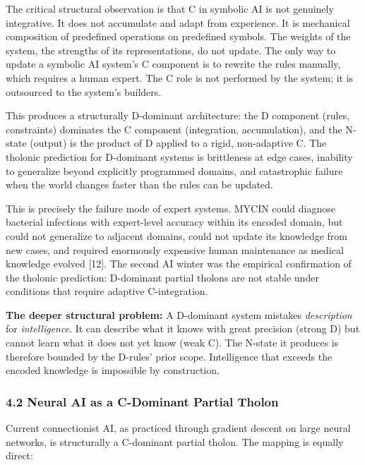 \documentclass[
  11pt,
  letterpaper,
]{article}
\begin{document}
The critical structural observation is that C in symbolic AI is not
genuinely integrative. It does not accumulate and adapt from experience.
It is mechanical composition of predefined operations on predefined
symbols. The weights of the system, the strengths of its
representations, do not update. The only way to update a symbolic AI
system's C component is to rewrite the rules manually, which requires a
human expert. The C role is not performed by the system; it is
outsourced to the system's builders.

This produces a structurally D-dominant architecture: the D component
(rules, constraints) dominates the C component (integration,
accumulation), and the N-state (output) is the product of D applied to a
rigid, non-adaptive C. The tholonic prediction for D-dominant systems is
brittleness at edge cases, inability to generalize beyond explicitly
programmed domains, and catastrophic failure when the world changes
faster than the rules can be updated.

This is precisely the failure mode of expert systems. MYCIN could
diagnose bacterial infections with expert-level accuracy within its
encoded domain, but could not generalize to adjacent domains, could not
update its knowledge from new cases, and required enormously expensive
human maintenance as medical knowledge evolved {[}12{]}. The second AI
winter was the empirical confirmation of the tholonic prediction:
D-dominant partial tholons are not stable under conditions that require
adaptive C-integration.

\textbf{The deeper structural problem:} A D-dominant system mistakes
\emph{description} for \emph{intelligence}. It can describe what it
knows with great precision (strong D) but cannot learn what it does not
yet know (weak C). The N-state it produces is therefore bounded by the
D-rules' prior scope. Intelligence that exceeds the encoded knowledge is
impossible by construction.

\subsubsection{4.2 Neural AI as a C-Dominant Partial
Tholon}\label{neural-ai-as-a-c-dominant-partial-tholon}

Current connectionist AI, as practiced through gradient descent on large
neural networks, is structurally a C-dominant partial tholon. The
mapping is equally direct:
\end{document}
